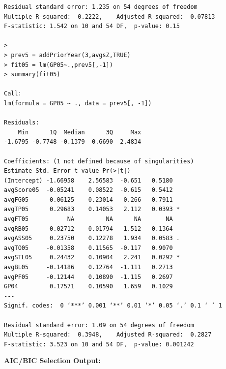 \documentclass[]{scrartcl}
\begin{document}
\begin{verbatim}
Residual standard error: 1.235 on 54 degrees of freedom
Multiple R-squared:  0.2222,	Adjusted R-squared:  0.07813 
F-statistic: 1.542 on 10 and 54 DF,  p-value: 0.15

> 
> prev5 = addPriorYear(3,avgsZ,TRUE)
> fit05 = lm(GP05~.,prev5[,-1])
> summary(fit05)

Call:
lm(formula = GP05 ~ ., data = prev5[, -1])

Residuals:
    Min      1Q  Median      3Q     Max 
-1.6795 -0.7748 -0.1379  0.6690  2.4834 

Coefficients: (1 not defined because of singularities)
Estimate Std. Error t value Pr(>|t|)  
(Intercept) -1.66958    2.56583  -0.651   0.5180  
avgScore05  -0.05241    0.08522  -0.615   0.5412  
avgFG05      0.06125    0.23014   0.266   0.7911  
avgTP05      0.29683    0.14053   2.112   0.0393 *
avgFT05           NA         NA      NA       NA  
avgRB05      0.02712    0.01794   1.512   0.1364  
avgASS05     0.23750    0.12278   1.934   0.0583 .
avgTO05     -0.01358    0.11565  -0.117   0.9070  
avgSTL05     0.24432    0.10904   2.241   0.0292 *
avgBL05     -0.14186    0.12764  -1.111   0.2713  
avgPF05     -0.12144    0.10890  -1.115   0.2697  
GP04         0.17571    0.10590   1.659   0.1029  
---
Signif. codes:  0 ‘***’ 0.001 ‘**’ 0.01 ‘*’ 0.05 ‘.’ 0.1 ‘ ’ 1

Residual standard error: 1.09 on 54 degrees of freedom
Multiple R-squared:  0.3948,	Adjusted R-squared:  0.2827 
F-statistic: 3.523 on 10 and 54 DF,  p-value: 0.001242
\end{verbatim}
\normalsize
{\textbf{AIC/BIC Selection Output:}}
\footnotesize
\end{document}
